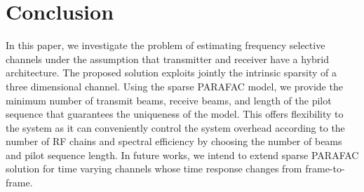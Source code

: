 \documentclass[conference]{IEEEtran}
\begin{document}
\section{Conclusion}
In this paper, we investigate the problem of estimating frequency selective
channels under the assumption that transmitter and receiver have a hybrid
architecture. The proposed solution exploits jointly the intrinsic sparsity of a
three dimensional channel. Using the sparse \gls{PARAFAC} model, we provide the minimum
number of transmit beams,  receive beams, and length of the pilot sequence that
guarantees the uniqueness of the model. This offers  flexibility to the system
as it can conveniently control the system overhead according to the number of \gls{RF} chains and spectral efficiency by choosing the number of beams and pilot
sequence length. In future works, we intend to extend sparse \gls{PARAFAC} solution for time
varying channels whose time response changes from frame-to-frame.




\end{document}
